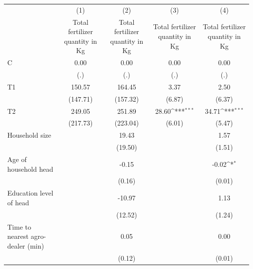{
\def\sym#1{\ifmmode^{#1}\else\(^{#1}\)\fi}
\begin{tabular}{l*{4}{c}}
\hline\hline
                    &\multicolumn{1}{c}{(1)}&\multicolumn{1}{c}{(2)}&\multicolumn{1}{c}{(3)}&\multicolumn{1}{c}{(4)}\\
                    &\multicolumn{1}{c}{Total fertilizer quantity in Kg}&\multicolumn{1}{c}{Total fertilizer quantity in Kg}&\multicolumn{1}{c}{Total fertilizer quantity in Kg}&\multicolumn{1}{c}{Total fertilizer quantity in Kg}\\
\hline
C                   &        0.00         &        0.00         &        0.00         &        0.00         \\
                    &         (.)         &         (.)         &         (.)         &         (.)         \\
[1em]
T1                  &      150.57         &      164.45         &        3.37         &        2.50         \\
                    &    (147.71)         &    (157.32)         &      (6.87)         &      (6.37)         \\
[1em]
T2                  &      249.05         &      251.89         &       28.60\sym{***}&       34.71\sym{***}\\
                    &    (217.73)         &    (223.04)         &      (6.01)         &      (5.47)         \\
[1em]
Household size      &                     &       19.43         &                     &        1.57         \\
                    &                     &     (19.50)         &                     &      (1.51)         \\
[1em]
Age of household head&                     &       -0.15         &                     &       -0.02\sym{*}  \\
                    &                     &      (0.16)         &                     &      (0.01)         \\
[1em]
Education level of head&                     &      -10.97         &                     &        1.13         \\
                    &                     &     (12.52)         &                     &      (1.24)         \\
[1em]
Time to nearest agro-dealer (min)&                     &        0.05         &                     &        0.00         \\
                    &                     &      (0.12)         &                     &      (0.01)         \\

\end{tabular}}
